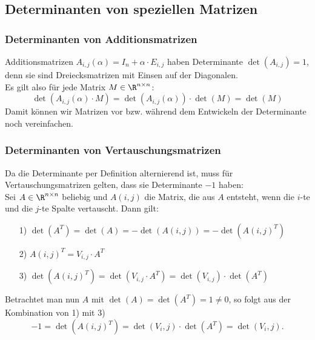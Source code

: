 \subsection{Determinanten von speziellen Matrizen}
%
\begin{frame}\frametitle{Determinanten von Additionsmatrizen}
Additionsmatrizen $A_{i,j}(\alpha)=I_n+\alpha\cdot E_{i,j}$ haben Determinante $\det(A_{i,j})=1$, denn sie sind Dreiecksmatrizen mit Einsen auf der Diagonalen. \pause\\\vfill
Es gilt also für jede Matrix $M \in \R^{n\times n}$: 
$$
\det(A_{i,j}(\alpha)\cdot M)=\det(A_{i,j}(\alpha))\cdot \det( M)=\det(M)
$$\pause\vfill
Damit können wir Matrizen vor bzw. während dem Entwickeln der Determinante noch vereinfachen.

\end{frame}
%
\begin{frame}\frametitle{Determinanten von Vertauschungsmatrizen}
Da die Determinante per Definition alternierend ist, muss für Vertauschungsmatrizen gelten, dass sie Determinante $-1$ haben:\\\vfill\pause
Sei $A \in \R^{n\times n}$ beliebig und $A(i,j)$ die Matrix, die aus $A$ entsteht, wenn die $i$-te und die $j$-te Spalte vertauscht. Dann gilt:\pause
\begin{itemize}
\item[1)] $\det(A^T)=\det(A)=-\det(A(i,j))=-\det(A(i,j)^T)$ \pause
\item[2)] $A(i,j)^T = V_{i,j}\cdot A^T$ \pause
\item[3)] $\det(A(i,j)^T)=\det(V_{i,j}\cdot A^T)=\det(V_{i,j})\cdot\det( A^T)$
\end{itemize}
\vfill
Betrachtet man nun $A$ mit $\det(A)=\det(A^T)=1 \ne 0$, so folgt aus der Kombination von 1) mit 3)
$$
-1=\det(A(i,j)^T)=\det(V_i,j)\cdot \det(A^T)=\det(V_i,j).
$$
\end{frame}
%
